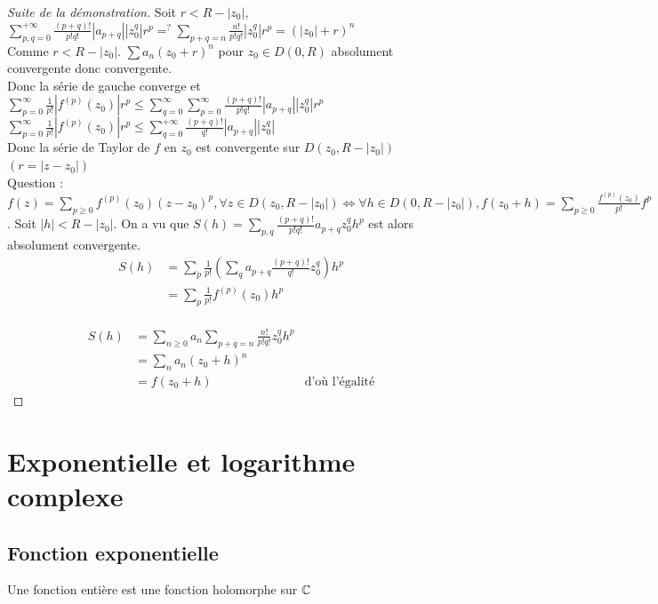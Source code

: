 \documentclass[]{report}
\begin{document}
\begin{proof}[Suite de la démonstration]
    Soit $r<R-|z_0|$, $\sum_{p,q=0}^{+\infty}\frac{(p+q)!}{p!q!}|a_{p+q}||z_0^q|r^p=^?\sum_{p+q=n}\frac{n!}{p!q!}|z_0^q|r^p=(|z_0|+r)^n$\\
    Comme $r<R-|z_0|$. $\sum a_n(z_0+r)^n$ pour $z_0\in D(0,R)$ absolument convergente donc convergente.\\
    Donc la série de gauche converge et \\
    $\sum_{p=0}^{\infty}\frac{1}{p!}|f^{(p)}(z_0)|r^p\le\sum_{q=0}^{\infty}\sum_{p=0}^{\infty}\frac{(p+q)!}{p!q!}|a_{p+q}||z_0^q|r^p$\\
    $\sum_{p=0}^{\infty}\frac{1}{p!}|f^{(p)}(z_0)|r^p\le \sum_{q=0}^{+\infty}\frac{(p+q)!}{q!}|a_{p+q}||z_0^q|$\\
    Donc la série de Taylor de $f$ en $z_0$ est convergente sur $D(z_0,R-|z_0|)$ $(r=|z-z_0|)$\\
    Question : $f(z)=\sum_{p\ge0}f^{(p)}(z_0)(z-z_0)^p,\forall z\in D(z_0,R-|z_0|)\iff \forall h \in D(0,R-|z_0|),f(z_0+h)=\sum_{p\ge 0}\frac{f^{(p)}(z_0)}{p!}f^p$. Soit $|h|<R-|z_0|$. On a vu que $S(h)=\sum_{p,q}\frac{(p+q)!}{p!q!}a_{p+q}z_0^qh^p$ est alors absolument convergente.\\
    \begin{align*} 
S(h) & = \sum_{p}\frac{1}{p!}(\sum_{q}a_{p+q}\frac{(p+q)!}{q!}z_0^q)h^p\\
& =\sum_{p} \frac{1}{p!}f^{(p)}(z_0)h^p 
\end{align*}\\
     \begin{align*}
S(h) & = \sum_{n\ge0}a_n\sum_{p+q=n}\frac{n!}{p!q!}z_0^qh^p \\
& = \sum_n a_n (z_0+h)^n \\
&=f(z_0+h) & \text{d'où l'égalité}
\end{align*} 
\end{proof}

\chapter{Exponentielle et logarithme complexe}

\section{Fonction exponentielle}

\begin{df}
    Une fonction entière est une fonction holomorphe sur $\mathbb{C}$
\end{df}
\end{document}
